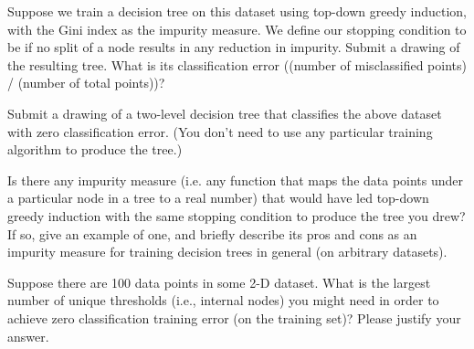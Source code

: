 \subproblem[5] Suppose we train a decision tree on this dataset using top-down greedy induction, with the Gini index as
the impurity measure. We define our stopping condition to be if no split of a node
results in any reduction in impurity. Submit a drawing of the resulting tree.  What is its classification error ((number of misclassified points) / (number of total points))?

\subproblem[5] Submit a drawing of a two-level decision tree that classifies the above dataset with zero classification error.  (You don't need to use any particular training algorithm to produce the tree.)

Is there any impurity measure (i.e. any function that maps the data points under a particular node in a tree to a real number) that would have led top-down greedy induction with the same stopping condition to produce the tree you drew?  If so, give an example of one, and briefly describe its pros and cons as an impurity measure for training decision trees in general (on arbitrary datasets). 

\subproblem[5] Suppose there are 100 data points in some 2-D dataset. What is the largest number of unique thresholds (i.e., internal nodes) you might need in order to achieve zero classification training error (on the training set)? Please
justify your answer.

